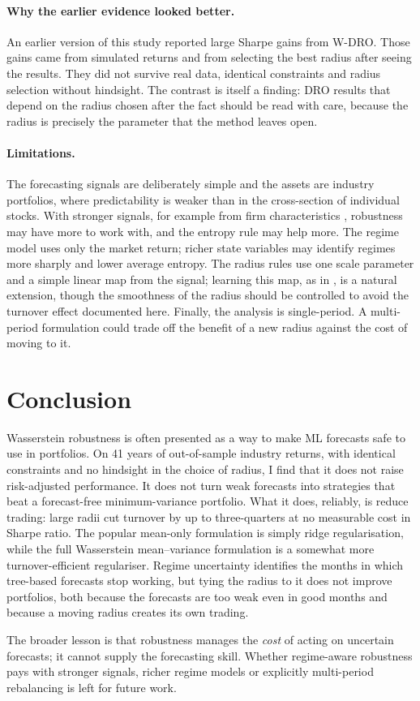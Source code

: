 \documentclass[11pt]{article}
\begin{document}
\paragraph{Why the earlier evidence looked better.} An earlier version of this study reported large Sharpe gains from W-DRO. Those gains came from simulated returns and from selecting the best radius after seeing the results. They did not survive real data, identical constraints and radius selection without hindsight. The contrast is itself a finding: DRO results that depend on the radius chosen after the fact should be read with care, because the radius is precisely the parameter that the method leaves open.

\paragraph{Limitations.} The forecasting signals are deliberately simple and the assets are industry portfolios, where predictability is weaker than in the cross-section of individual stocks. With stronger signals, for example from firm characteristics \citep{gu2020}, robustness may have more to work with, and the entropy rule may help more. The regime model uses only the market return; richer state variables may identify regimes more sharply and lower average entropy. The radius rules use one scale parameter and a simple linear map from the signal; learning this map, as in \citet{guo2026a}, is a natural extension, though the smoothness of the radius should be controlled to avoid the turnover effect documented here. Finally, the analysis is single-period. A multi-period formulation could trade off the benefit of a new radius against the cost of moving to it.

\section{Conclusion}\label{sec:conc}

Wasserstein robustness is often presented as a way to make ML forecasts safe to use in portfolios. On 41 years of out-of-sample industry returns, with identical constraints and no hindsight in the choice of radius, I find that it does not raise risk-adjusted performance. It does not turn weak forecasts into strategies that beat a forecast-free minimum-variance portfolio. What it does, reliably, is reduce trading: large radii cut turnover by up to three-quarters at no measurable cost in Sharpe ratio. The popular mean-only formulation is simply ridge regularisation, while the full Wasserstein mean--variance formulation is a somewhat more turnover-efficient regulariser. Regime uncertainty identifies the months in which tree-based forecasts stop working, but tying the radius to it does not improve portfolios, both because the forecasts are too weak even in good months and because a moving radius creates its own trading.

The broader lesson is that robustness manages the \emph{cost} of acting on uncertain forecasts; it cannot supply the forecasting skill. Whether regime-aware robustness pays with stronger signals, richer regime models or explicitly multi-period rebalancing is left for future work.

\clearpage


\end{document}
